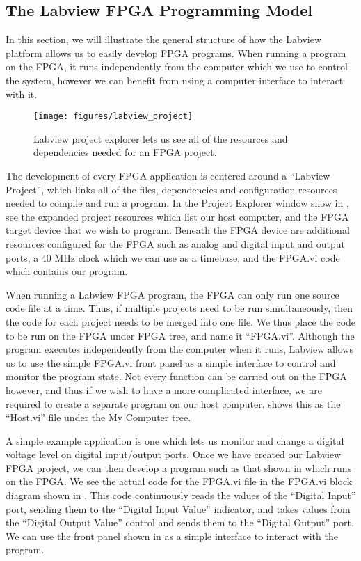 \subsection{The Labview FPGA Programming Model} 

In this section, we will illustrate the general structure of how the Labview platform allows us to easily develop FPGA programs.  When running a program on the FPGA, it runs independently from the computer which we use to control the system, however we can benefit from using a computer interface to interact with it.

\begin{figure}[!ht] 
 \centering 
 \texttt{[image: figures/labview\_project]} 
 \caption[Labview project window]{Labview project explorer lets us see all of the resources and dependencies needed for an FPGA project.} 
 \label{fig:labview_project} 
\end{figure}

The development of every FPGA application is centered around a ``Labview Project'', which links all of the files, dependencies and configuration resources needed to compile and run a program.  In the Project Explorer window show in , see the expanded project resources which list our host computer, and the FPGA target device that we wish to program.  Beneath the FPGA device are additional resources configured for the FPGA such as analog and digital input and output ports, a 40 MHz clock which we can use as a timebase, and the FPGA.vi code which contains our program.  

When running a Labview FPGA program, the FPGA can only run one source code file at a time.  Thus, if multiple projects need to be run simultaneously, then the code for each project needs to be merged into one file.  We thus place the code to be run on the FPGA under FPGA tree, and name it ``FPGA.vi''.  Although the program executes independently from the computer when it runs, Labview allows us to use the simple FPGA.vi front panel as a simple interface to control and monitor the program state.  Not every function can be carried out on the FPGA however, and thus if we wish to have a more complicated interface, we are required to create a separate program on our host computer.   shows this as the ``Host.vi'' file under the My Computer tree.  



A simple example application is one which lets us monitor and change a digital voltage level on digital input/output ports.  Once we have created our Labview FPGA project, we can then develop a program such as that shown in  which runs on the FPGA.  We see the actual code for the FPGA.vi file in the FPGA.vi block diagram shown in .  This code continuously reads the values of the ``Digital Input'' port, sending them to the ``Digital Input Value'' indicator, and takes values from the ``Digital Output Value'' control and sends them to the ``Digital Output'' port.  We can use the front panel shown in  as a simple interface to interact with the program.

